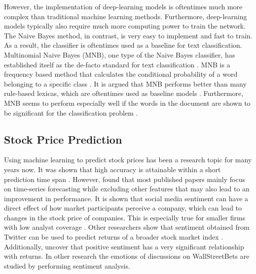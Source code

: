 \documentclass[11pt, a4paper]{article}
\begin{document}
However, the implementation of deep-learning models is oftentimes much more complex than traditional machine learning methods. Furthermore, deep-learning models typically
also require much more computing power to train the network. The Naive Bayes method, in contrast, is very easy to implement and fast to train. As a
result, the classifier is oftentimes used as a baseline for text classification. Multinomial Naive Bayes (MNB), one type of the Naive Bayes classifier, has established
itself as the de-facto standard for text classification \citep{abbas2019mnb}. MNB is a frequency based method that calculates the conditional probability of a word
belonging to a specific class \citep{susanti2017sentiment}. %
It is argued that MNB performs better than many rule-based lexicas, which are oftentimes
used as baseline models \citep{wang2012NB}. Furthermore, MNB seems to perform especially well if the words in the document are shown to be significant for the
classification problem \citep{omar2019conference}.


\subsection{Stock Price Prediction}

Using machine learning to predict stock prices has been a research topic for many years now. It was shown that high accuracy is attainable within
a short prediction time span \citep{schoneburg1990prediction}. However, \cite{gooijer2006forecasting} found that most published papers mainly focus on time-series forecasting while excluding other features
that may also lead to an improvement in performance.
It is shown that social media sentiment can have a 
direct effect of how market participants perceive a company, which can lead to changes in the stock price of companies. This is especially true for smaller 
firms with low analyst coverage \citep{feng2019824}. Other researchers show that sentiment obtained from Twitter can be used to predict returns of a 
broader stock market index \citep{gu2020twtrsentiment}.
Additionally, \cite{werner2004talknoise} uncover that positive sentiment has a very significant relationship with returns.
In other research the emotions of discussions on WallStreetBets are studied by performing sentiment analysis. 
\end{document}
